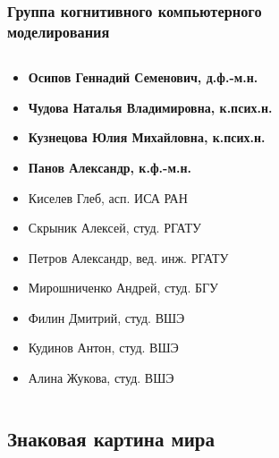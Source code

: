 \documentclass[default]{beamer}
\begin{document}
	\begin{frame}
		\frametitle{Группа когнитивного компьютерного\\моделирования}
		\small
		\begin{columns}
			\begin{column}{0.65\textwidth}
				\vspace{-10pt}
				\begin{itemize}
					\item \textbf{Осипов Геннадий Семенович, д.ф.-м.н.}
					\item \textbf{Чудова Наталья Владимировна, к.псих.н.}
					\item \textbf{Кузнецова Юлия Михайловна, к.псих.н.}
					\item \textbf{Панов Александр, к.ф.-м.н.}
					\item Киселев Глеб, асп. ИСА РАН
					\item Скрыник Алексей, студ. РГАТУ
					\item Петров Александр, вед. инж. РГАТУ
					\item Мирошниченко Андрей, студ. БГУ
					\item Филин Дмитрий, студ. ВШЭ
					\item Кудинов Антон, студ. ВШЭ
					\item Алина Жукова, студ. ВШЭ		
				\end{itemize}
			\end{column}
			\begin{column}{0.35\textwidth}
			\end{column}
		\end{columns}		
	\end{frame}	
		
	\subsection{Знаковая картина мира}
	
\end{document}
